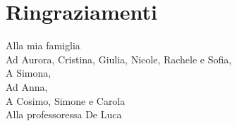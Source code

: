 \documentclass[12pt,a4paper,openright,twoside]{report}
\begin{document}
                                        \chapter*{Ringraziamenti}
                                        \thispagestyle{empty}
                                        Alla mia famiglia \\
                                        Ad Aurora, Cristina, Giulia, Nicole, Rachele e Sofia, \\
                                        A Simona, \\
                                        Ad Anna, \\
                                        A Cosimo, Simone e Carola \\
                                        Alla professoressa De Luca \\
                                        
\end{document}
